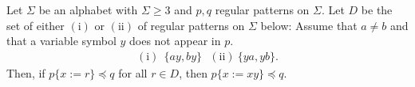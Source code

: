\begin{lem}\label{変数2つ}
Let $\Sigma$ be an alphabet with $\Sigma \ge 3$ and $p,q$ regular patterns on $\Sigma$.
Let $D$ be the set of either $(\mathrm{i})$ or $(\mathrm{ii})$ of regular patterns on $\Sigma$ below: Assume that $a \not= b$ and that a variable symbol $y$ does not appear in $p$.
\begin{align*}
(\mathrm{i})~~\{ ay, by \}~~~(\mathrm{ii})~\{ ya, yb \}.
\end{align*}
Then, if $p \{ x := r \} \preceq q$ for all $r \in D$, then $p \{ x := xy \} \preceq q$.
\end{lem}
